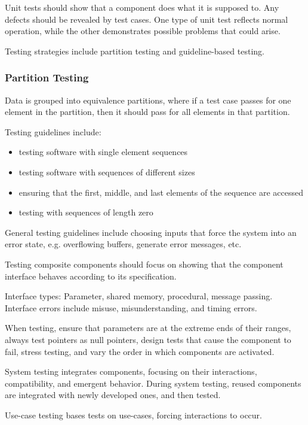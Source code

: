 \documentclass[12pt]{article}
\begin{document}
Unit tests should show that a component does what it is supposed to. Any
defects should be revealed by test cases. One type of unit test reflects normal
operation, while the other demonstrates possible problems that could arise.

Testing strategies include partition testing and guideline-based testing.

\subsubsection*{Partition Testing}

Data is grouped into equivalence partitions, where if a test case passes for
one element in the partition, then it should pass for all elements in that
partition.

Testing guidelines include:

\begin{itemize}
    \item testing software with single element sequences
    \item testing software with sequences of different sizes
    \item ensuring that the first, middle, and last elements of the sequence
    are accessed
    \item testing with sequences of length zero
\end{itemize}

General testing guidelines include choosing inputs that force the system into
an error state, e.g. overflowing buffers, generate error messages, etc.

Testing composite components should focus on showing that the component
interface behaves according to its specification.

Interface types: Parameter, shared memory, procedural, message passing.
Interface errors include misuse, misunderstanding, and timing errors.

When testing, ensure that parameters are at the extreme ends of their ranges,
always test pointers as null pointers, design tests that cause the component to
fail, stress testing, and vary the order in which components are activated.

System testing integrates components, focusing on their interactions,
compatibility, and emergent behavior. During system testing, reused components
are integrated with newly developed ones, and then tested.

Use-case testing bases tests on use-cases, forcing interactions to occur.
\end{document}
